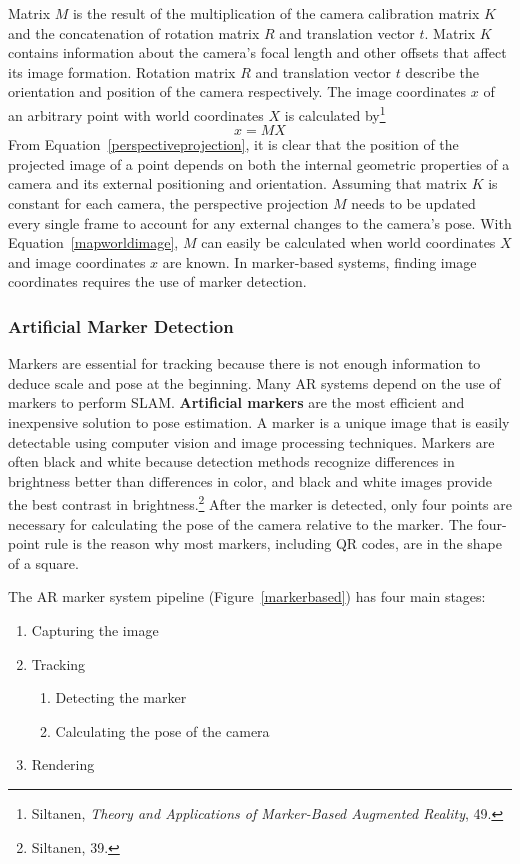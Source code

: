 Matrix $M$ is the result of the multiplication of the camera calibration matrix $K$ and the concatenation of rotation matrix $R$ and translation vector $t$. Matrix $K$ contains information about the camera's focal length and other offsets that affect its image formation. Rotation matrix $R$ and translation vector $t$ describe the orientation and position of the camera respectively. The image coordinates $x$ of an arbitrary point with world coordinates $X$ is calculated by\footnote{Siltanen, \textit{Theory and Applications of Marker-Based Augmented Reality}, 49.}
\begin{equation}\label{mapworldimage}
x = MX
\end{equation}
From Equation~\ref{perspectiveprojection}, it is clear that the position of the projected image of a point depends on both the internal geometric properties of a camera and its external positioning and orientation. Assuming that matrix $K$ is constant for each camera, the perspective projection $M$ needs to be updated every single frame to account for any external changes to the camera's pose. With Equation~\ref{mapworldimage}, $M$ can easily be calculated when world coordinates $X$ and image coordinates $x$ are known. In marker-based systems, finding image coordinates requires the use of marker detection.

\subsubsection{Artificial Marker Detection}

Markers are essential for tracking because there is not enough information to deduce scale and pose at the beginning. Many AR systems depend on the use of markers to perform SLAM. \textbf{Artificial markers} are the most efficient and inexpensive solution to pose estimation. A marker is a unique image that is easily detectable using computer vision and image processing techniques. Markers are often black and white because detection methods recognize differences in brightness better than differences in color, and black and white images provide the best contrast in brightness.\footnote{Siltanen, 39.} After the marker is detected, only four points are necessary for calculating the pose of the camera relative to the marker. The four-point rule is the reason why most markers, including QR codes, are in the shape of a square.

The AR marker system pipeline (Figure~\ref{markerbased}) has four main stages:
\begin{enumerate}
	\item Capturing the image
	\item Tracking
	\begin{enumerate}
		\item Detecting the marker
		\item Calculating the pose of the camera
	\end{enumerate}
	\item Rendering
\end{enumerate}


